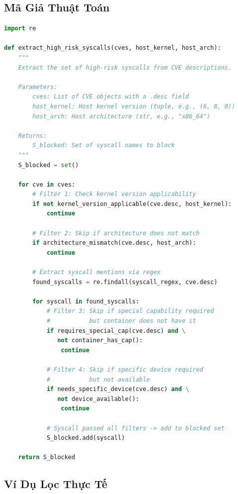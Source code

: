 \subsection{Mã Giả Thuật Toán}
\label{subsec:appendix_pseudocode}

\begin{lstlisting}[float=htbp, language=Python, caption={Bộ phân tích CVE dựa trên quy tắc: thuật toán trích xuất syscall.}]
import re

def extract_high_risk_syscalls(cves, host_kernel, host_arch):
    """
    Extract the set of high-risk syscalls from CVE descriptions.

    Parameters:
        cves: List of CVE objects with a .desc field
        host_kernel: Host kernel version (tuple, e.g., (6, 8, 0))
        host_arch: Host architecture (str, e.g., "x86_64")

    Returns:
        S_blocked: Set of syscall names to block
    """
    S_blocked = set()

    for cve in cves:
        # Filter 1: Check kernel version applicability
        if not kernel_version_applicable(cve.desc, host_kernel):
            continue

        # Filter 2: Skip if architecture does not match
        if architecture_mismatch(cve.desc, host_arch):
            continue

        # Extract syscall mentions via regex
        found_syscalls = re.findall(syscall_regex, cve.desc)

        for syscall in found_syscalls:
            # Filter 3: Skip if special capability required
            #           but container does not have it
            if requires_special_cap(cve.desc) and \
               not container_has_cap():
                continue

            # Filter 4: Skip if specific device required
            #           but not available
            if needs_specific_device(cve.desc) and \
               not device_available():
                continue

            # Syscall passed all filters -> add to blocked set
            S_blocked.add(syscall)

    return S_blocked
\end{lstlisting}

\subsection{Ví Dụ Lọc Thực Tế}
\label{subsec:appendix_examples}


